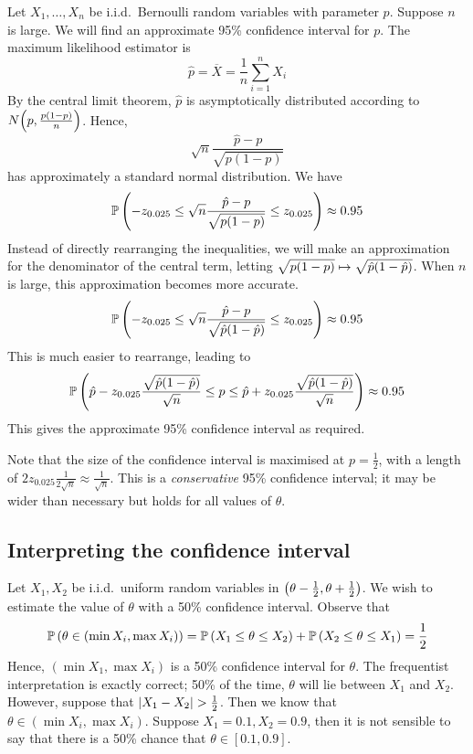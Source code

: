 \begin{example}
	Let \( X_1, \dots, X_n \) be i.i.d.\ Bernoulli random variables with parameter \( p \).
	Suppose \( n \) is large.
	We will find an approximate 95\% confidence interval for \( p \).
	The maximum likelihood estimator is
	\[ \hat p = \overline X = \frac{1}{n} \sum_{i=1}^n X_i \]
	By the central limit theorem, \( \hat p \) is asymptotically distributed according to \( N\qty(p, \frac{p(1-p)}{n}) \).
	Hence,
	\[ \sqrt{n}\frac{\hat p - p}{\sqrt{p(1-p)}} \]
	has approximately a standard normal distribution.
	We have
	\[ \mathbb{P}\left({-z_{0.025} \leq \sqrt{n}\frac{\hat p - p}{\sqrt{p(1-p)}} \leq z_{0.025}}\right) \approx 0.95 \]
	Instead of directly rearranging the inequalities, we will make an approximation for the denominator of the central term, letting \( \sqrt{p(1-p)} \mapsto \sqrt{\hat p\qty(1-\hat p)} \).
	When \( n \) is large, this approximation becomes more accurate.
	\[ \mathbb{P}\left({-z_{0.025} \leq \sqrt{n}\frac{\hat p - p}{\sqrt{\hat p\qty(1-\hat p)}} \leq z_{0.025}}\right) \approx 0.95 \]
	This is much easier to rearrange, leading to
	\[ \mathbb{P}\left({\hat p - z_{0.025}\frac{\sqrt{\hat p\qty(1-\hat p)}}{\sqrt{n}} \leq p \leq \hat p + z_{0.025}\frac{\sqrt{\hat p\qty(1-\hat p)}}{\sqrt{n}}}\right) \approx 0.95 \]
	This gives the approximate 95\% confidence interval as required.
\end{example}
\begin{remark}
	Note that the size of the confidence interval is maximised at \( p = \frac{1}{2} \), with a length of \( 2z_{0.025} \frac{1}{2\sqrt{n}} \approx \frac{1}{\sqrt{n}} \).
	This is a \textit{conservative} 95\% confidence interval; it may be wider than necessary but holds for all values of \( \theta \).
\end{remark}

\subsection{Interpreting the confidence interval}
\begin{example}
	Let \( X_1, X_2 \) be i.i.d.\ uniform random variables in \( \qty(\theta - \frac{1}{2}, \theta + \frac{1}{2}) \).
	We wish to estimate the value of \( \theta \) with a 50\% confidence interval.
	Observe that
	\[ \mathbb{P}\left({\theta \in (\min X_i, \max X_i)}\right) = \mathbb{P}\left({X_1 \leq \theta \leq X_2}\right) + \mathbb{P}\left({X_2 \leq \theta \leq X_1}\right) = \frac{1}{2} \]
	Hence, \( (\min X_1, \max X_i) \) is a 50\% confidence interval for \( \theta \).
	The frequentist interpretation is exactly correct; 50\% of the time, \( \theta \) will lie between \( X_1 \) and \( X_2 \).
	However, suppose that \( \abs{X_1 - X_2} > \frac{1}{2} \).
	Then we know that \( \theta \in (\min X_i, \max X_i) \).
	Suppose \( X_1 = 0.1, X_2 = 0.9 \), then it is not sensible to say that there is a 50\% chance that \( \theta \in [0.1, 0.9] \).
\end{example}
